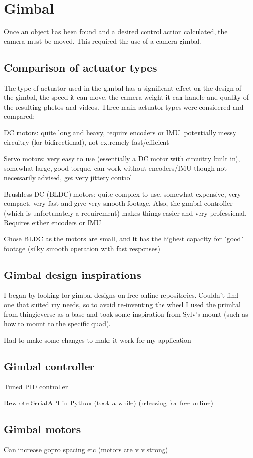 \section{Gimbal}
Once an object has been found and a desired control action calculated, the camera must be moved. This required the use of a camera gimbal.

\subsection{Comparison of actuator types}
The type of actuator used in the gimbal has a significant effect on the design of the gimbal, the speed it can move, the camera weight it can handle and quality of the resulting photos and videos. Three main actuator types were considered and compared:

DC motors: quite long and heavy, require encoders or IMU, potentially messy circuitry (for bidirectional), not extremely fast/efficient

Servo motors: very easy to use (essentially a DC motor with circuitry built in), somewhat large, good torque, can work without encoders/IMU though not necessarily advised, get very jittery control

Brushless DC (BLDC) motors: quite complex to use, somewhat expensive, very compact, very fast and give very smooth footage. Also, the gimbal controller (which is unfortunately a requirement) makes things easier and very professional. Requires either encoders or IMU

Chose BLDC as the motors are small, and it has the highest capacity for "good" footage (silky smooth operation with fast responses)

\subsection{Gimbal design inspirations}
I began by looking for gimbal designs on free online repositories. Couldn't find one that suited my needs, so to avoid re-inventing the wheel I used the primbal from thingieverse as a base and took some inspiration from Sylv's mount (such as how to mount to the specific quad).

Had to make some changes to make it work for my application

\subsection{Gimbal controller}
Tuned PID controller

Rewrote SerialAPI in Python (took a while) (releasing for free online)

\subsection{Gimbal motors}
Can increase gopro spacing etc (motors are v v strong)